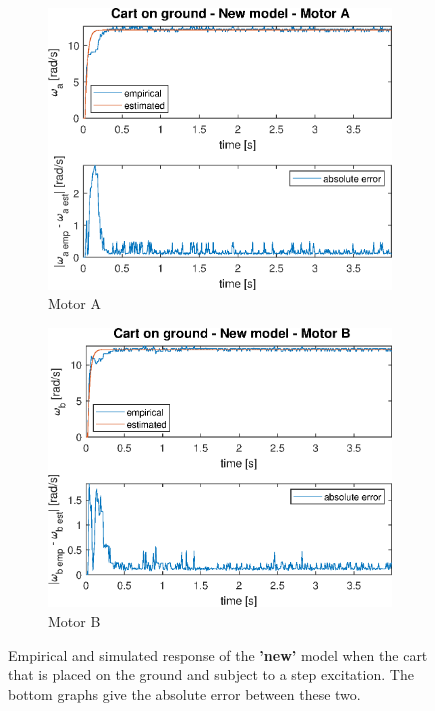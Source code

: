 \documentclass[a4paper,kul]{kulakarticle} %
\begin{document}
\begin{figure}[htp!]
	\centering
	\begin{subfigure}[b]{0.49\textwidth}
		\centering
		\includegraphics[width=\textwidth]{step_response_g_NF_a.eps}
		\caption{Motor A}
	\end{subfigure}
	\hfill
	\begin{subfigure}[b]{0.49\textwidth}  
		\centering 
		\includegraphics[width=\textwidth]{step_response_g_NF_b.eps}
		\caption{Motor B}
	\end{subfigure}
	\caption[Cart on the ground, new model]{Empirical and simulated response of the \textbf{'new'} model when the cart that is placed on the ground and subject to a step excitation. The bottom graphs give the absolute error between these two.} 
	\label{fig:step_ground_new}
\end{figure}
\end{document}
